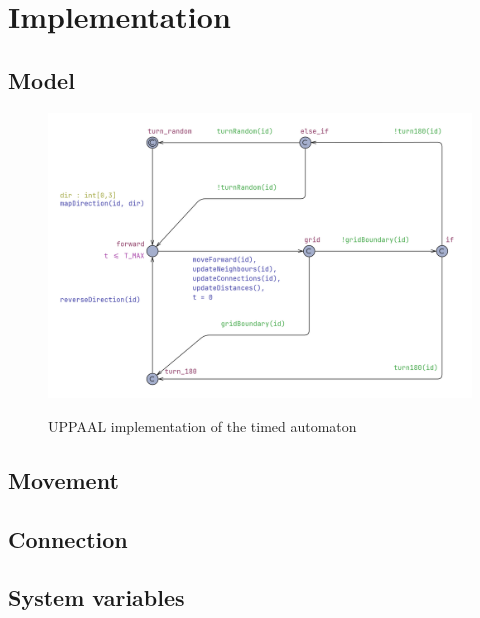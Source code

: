 \section{Implementation}

\subsection{Model}
\begin{figure}[H]
\caption{UPPAAL implementation of the timed automaton}
\includegraphics[width=\textwidth]{images/implementation.png}
\label{fig:implementation}
\end{figure}



\subsection{Movement}



\subsection{Connection}



\subsection{System variables}
